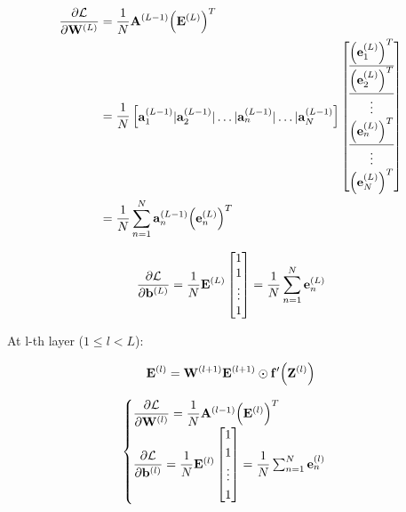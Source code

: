 \documentclass[14pt, a4paper]{article}
\numberwithin{equation}{section}
\numberwithin{algorithm}{section}
\numberwithin{figure}{section}
\begin{document}
\begin{equation}
  \begin{aligned}
    \dfrac{\partial \mathcal{L}}{\partial \bold{W}^{(L)}}&=\dfrac{1}{N}\bold{A}^{(L-1)} \Big(\bold{E}^{(L)}\Big)^T\\&=\dfrac{1}{N}\begin{bmatrix} \bold{a}_1^{(L-1)} \vert \bold{a}_2^{(L-1)} \vert \dots \vert \bold{a}_n^{(L-1)} \vert \dots \vert \bold{a}_N^{(L-1)} \end{bmatrix}\begin{bmatrix} \underline{\Big(\bold{e}_1^{(L)}\Big)^T} \\ \underline{\Big(\bold{e}_2^{(L)}\Big)^T} \\ \vdots \\ \underline{\Big(\bold{e}_n^{(L)}\Big)^T} \\ \vdots \\ \Big(\bold{e}_N^{(L)}\Big)^T \end{bmatrix}\\&=\dfrac{1}{N}\sum_{n=1}^{N} \bold{a}_n^{(L-1)}\Big(\bold{e}_n^{(L)}\Big)^T
  \end{aligned}
\end{equation}

\begin{equation}
  \dfrac{\partial \mathcal{L}}{\partial \bold{b}^{(L)}}=\dfrac{1}{N}\bold{E}^{(L)}\begin{bmatrix} 1 \\ 1 \\ \vdots \\ 1 \end{bmatrix}=\dfrac{1}{N}\sum_{n=1}^{N}\bold{e}_n^{(L)}
\end{equation}

At l-th layer ($1 \leq l < L$):

\begin{equation}
  \bold{E}^{(l)}=\bold{W}^{(l+1)}\bold{E}^{(l+1)}\odot \bold{f}^{\prime}\Big( \bold{Z}^{(l)} \Big)
\end{equation}

\begin{equation}
  \begin{cases}\dfrac{\partial \mathcal{L}}{\partial \bold{W}^{(l)}}=\dfrac{1}{N}\bold{A}^{(l-1)}\Big(\bold{E}^{(l)}\Big)^T \\ \dfrac{\partial \mathcal{L}}{\partial \bold{b}^{(l)}}=\dfrac{1}{N}\bold{E}^{(l)}\begin{bmatrix} 1 \\ 1 \\ \vdots \\ 1 \end{bmatrix}=\dfrac{1}{N}\sum_{n=1}^{N}\bold{e}_n^{(l)} \end{cases}
\end{equation}
\end{document}
